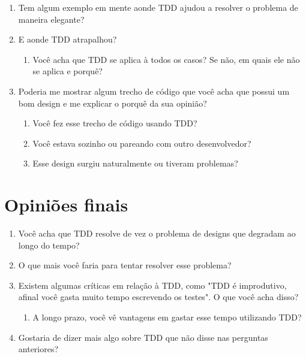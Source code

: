 \begin{enumerate}
	\item Tem algum exemplo em mente aonde TDD ajudou a resolver o problema de maneira elegante?
	\item E aonde TDD atrapalhou?
		\begin{enumerate}
			\item Você acha que TDD se aplica à todos os casos? Se não, em quais ele não se aplica e porquê?
		\end{enumerate}
	\item Poderia me mostrar algum trecho de código que você acha que possui um bom design e me explicar o porquê da sua opinião?
		\begin{enumerate}
			\item Você fez esse trecho de código usando TDD?
			\item Você estava sozinho ou pareando com outro desenvolvedor?
			\item Esse design surgiu naturalmente ou tiveram problemas?
		\end{enumerate}
\end{enumerate}


\section{Opiniões finais}

\begin{enumerate}
	\item Você acha que TDD resolve de vez o problema de designs que degradam ao longo do tempo?
	\item O que mais você faria para tentar resolver esse problema?
	\item Existem algumas críticas em relação à TDD, como "TDD é improdutivo, afinal você gasta muito tempo escrevendo os testes". O que você acha disso?
		\begin{enumerate}
			\item A longo prazo, você vê vantagens em gastar esse tempo utilizando TDD?
		\end{enumerate}
	\item Gostaria de dizer mais algo sobre TDD que não disse nas perguntas anteriores?
\end{enumerate}